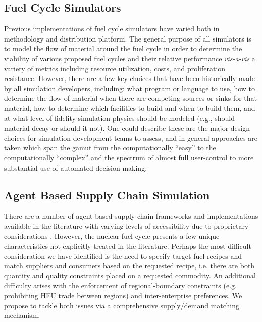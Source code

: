 \subsection{Fuel Cycle Simulators}

Previous implementations of fuel cycle simulators have varied both in
methodology and distribution platform. The general purpose of all simulators is
to model the flow of material around the fuel cycle in order to determine the
viability of various proposed fuel cycles and their relative
performance \textit{vis-a-vis} a variety of metrics including resource
utilization, costs, and proliferation resistance. However, there are a few key
choices that have been historically made by all simulation developers,
including: what program or language to use, how to determine the flow of
material when there are competing sources or sinks for that material, how to
determine which facilities to build and when to build them, and at what level of
fidelity simulation physics should be modeled (e.g., should material decay or
should it not). One could describe these are the major design choices for
simulation development teams to assess, and in general approaches are taken
which span the gamut from the computationally ``easy'' to the computationally
``complex'' and the spectrum of almost full user-control to more substantial use
of automated decision making.



\subsection{Agent Based Supply Chain Simulation}

There are a number of agent-based supply chain frameworks and implementations
available in the literature with varying levels of accessibility due to
proprietary
considerations \cite{swaminathan_modeling_1998,julka_agent-based_2002,van_der_zee_modeling_2005,chatfield_multi-formalism_2007}.
However, the nuclear fuel cycle presents a few unique characteristics not
explicitly treated in the literature. Perhaps the most difficult consideration
we have identified is the need to specify target fuel recipes and match
suppliers and consumers based on the requested recipe, i.e.  there are both
quantity and quality constraints placed on a requested commodity. An additional
difficulty arises with the enforcement of regional-boundary constraints
(e.g. prohibiting HEU trade between regions) and inter-enterprise
preferences. We propose to tackle both issues via a comprehensive supply/demand
matching mechanism.

